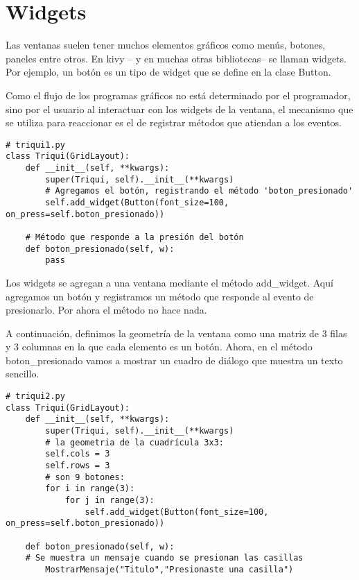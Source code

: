 \section{Widgets}
Las ventanas suelen tener muchos elementos gráficos como menús, botones, paneles
entre otros. En kivy -- y en muchas otras bibliotecas-- se llaman widgets. Por 
ejemplo, un botón es un tipo de widget que  se define en la clase Button.

Como el flujo de los programas gráficos no está determinado por el programador,
sino por el usuario al interactuar con los widgets de la ventana, el mecanismo
que se utiliza para reaccionar es el de registrar métodos que atiendan a los eventos.

\beforeverb
\begin{verbatim}
# triqui1.py
class Triqui(GridLayout):
    def __init__(self, **kwargs):
        super(Triqui, self).__init__(**kwargs)
        # Agregamos el botón, registrando el método 'boton_presionado'
        self.add_widget(Button(font_size=100, on_press=self.boton_presionado))
    
    # Método que responde a la presión del botón
    def boton_presionado(self, w):
        pass

\end{verbatim}
\afterverb

Los widgets se agregan a una ventana mediante el método add\_widget. Aquí agregamos
un botón y registramos un método que responde al evento de presionarlo. Por ahora 
el método no hace nada.

A continuación, definimos la geometría de la ventana como una matriz de 3 filas 
y 3 columnas en la que cada elemento es un botón. Ahora, en el método boton\_presionado
vamos a mostrar un cuadro de diálogo que muestra un texto sencillo.

\beforeverb
\begin{verbatim}
# triqui2.py
class Triqui(GridLayout):
    def __init__(self, **kwargs):
        super(Triqui, self).__init__(**kwargs)
        # la geometria de la cuadrícula 3x3:
        self.cols = 3
        self.rows = 3
        # son 9 botones:
        for i in range(3):
            for j in range(3):
                self.add_widget(Button(font_size=100, on_press=self.boton_presionado))
        
    def boton_presionado(self, w):
	# Se muestra un mensaje cuando se presionan las casillas
        MostrarMensaje("Titulo","Presionaste una casilla")

\end{verbatim}
\afterverb

